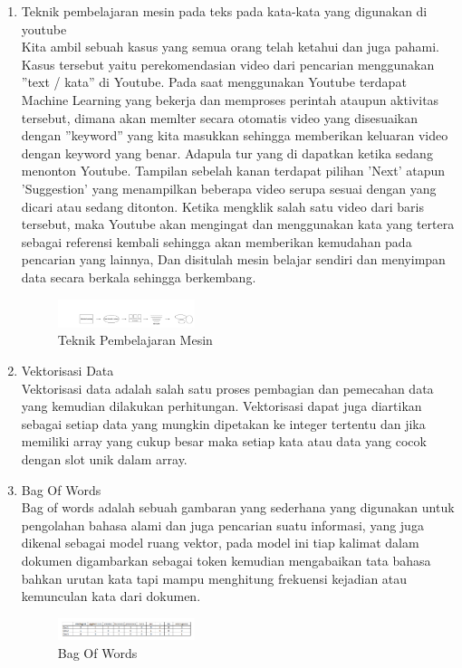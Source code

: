 \begin{enumerate}
\item Teknik pembelajaran mesin pada teks pada kata-kata yang digunakan di youtube\\
Kita ambil sebuah kasus yang semua orang telah ketahui dan juga pahami. Kasus tersebut yaitu perekomendasian video dari pencarian menggunakan ”text / kata” di Youtube. Pada saat menggunakan Youtube terdapat Machine Learning yang bekerja dan memproses perintah ataupun aktivitas tersebut, dimana akan memlter secara otomatis video yang disesuaikan dengan ”keyword” yang kita masukkan sehingga memberikan keluaran video dengan keyword yang benar. Adapula tur yang di dapatkan ketika sedang menonton Youtube. Tampilan sebelah kanan terdapat pilihan ’Next’ atapun ’Suggestion’ yang menampilkan beberapa video serupa sesuai dengan yang dicari atau sedang ditonton. Ketika mengklik salah satu video dari baris tersebut, maka Youtube akan mengingat dan menggunakan kata yang tertera sebagai referensi kembali sehingga akan memberikan kemudahan pada pencarian yang lainnya, Dan disitulah mesin belajar sendiri dan menyimpan data secara berkala sehingga berkembang.
\hfill\break
	\begin{figure}[H]
		\includegraphics[width=4cm]{figures/1174053/4/3.png}
		\centering
		\caption{Teknik Pembelajaran Mesin}
	\end{figure}

\item Vektorisasi Data\\
Vektorisasi data adalah salah satu proses pembagian dan pemecahan data yang kemudian dilakukan perhitungan. Vektorisasi dapat juga diartikan sebagai setiap data yang mungkin dipetakan ke integer tertentu dan jika memiliki array yang cukup besar maka setiap kata atau data yang cocok dengan slot unik dalam array. 

\item Bag Of Words\\
Bag of words adalah sebuah gambaran yang sederhana yang digunakan untuk pengolahan bahasa alami dan juga pencarian suatu informasi, yang juga dikenal sebagai model ruang vektor, pada model ini tiap kalimat dalam dokumen digambarkan sebagai token kemudian mengabaikan tata bahasa bahkan urutan kata tapi mampu menghitung frekuensi kejadian atau kemunculan kata dari dokumen.
\hfill\break
	\begin{figure}[H]
		\includegraphics[width=4cm]{figures/1174053/4/4.png}
		\centering
		\caption{Bag Of Words}
	\end{figure}


\end{enumerate}
